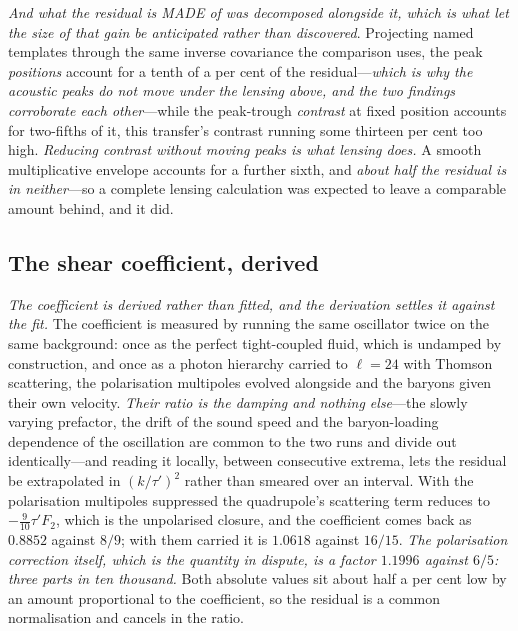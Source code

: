 \documentclass[11pt,a4paper]{article}
\theoremstyle{plain}
\theoremstyle{definition}
\theoremstyle{remark}
\begin{document}
\emph{And what the residual is MADE of was decomposed alongside it, which is what let the size of that
gain be anticipated rather than
discovered}. Projecting named
templates through the same inverse covariance the comparison uses, the peak \emph{positions} account for
a tenth of a per cent of the residual---\emph{which is why the acoustic peaks do not move under the
lensing above, and the two findings corroborate each other}---while the peak-trough \emph{contrast} at
fixed position accounts for two-fifths of it, this transfer's contrast running some thirteen per cent
too high. \emph{Reducing contrast without moving peaks is what lensing does.} A smooth multiplicative
envelope accounts for a further sixth, and \emph{about half the residual is in neither}---so a complete
lensing calculation was expected to leave a comparable amount behind, and it did.

\subsection{The shear coefficient, derived}\label{sec:shear-coefficient}

\emph{The coefficient is derived rather than fitted, and the derivation settles it against the
fit.} The coefficient is measured by running the same
oscillator twice on the same background: once as the perfect tight-coupled fluid, which is undamped by
construction, and once as a photon hierarchy carried to $\ell=24$ with Thomson scattering, the polarisation
multipoles evolved alongside and the baryons given their own velocity. \emph{Their ratio is the damping and
nothing else}---the slowly varying prefactor, the drift of the sound speed and the baryon-loading dependence
of the oscillation are common to the two runs and divide out identically---and reading it locally, between
consecutive extrema, lets the residual be extrapolated in $(k/\tau')^{2}$ rather than smeared over an
interval. With the polarisation multipoles suppressed the quadrupole's scattering term reduces to
$-\tfrac{9}{10}\tau'F_{2}$, which is the unpolarised closure, and the coefficient comes back as $0.8852$
against $8/9$; with them carried it is $1.0618$ against $16/15$. \emph{The polarisation correction itself,
which is the quantity in dispute, is a factor $1.1996$ against $6/5$: three parts in ten thousand.} Both
absolute values sit about half a per cent low by an amount proportional to the coefficient, so the residual is
a common normalisation and cancels in the
ratio.
\end{document}
